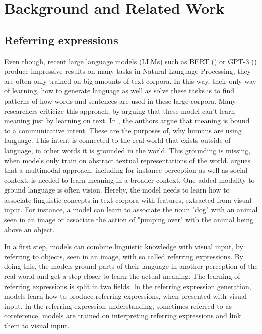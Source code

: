\section{Background and Related Work}
\label{sec:background}

\subsection{Referring expressions}
Even though, recent large language models (LLMs) such as BERT (\citet{Devlin2018}) or GPT-3 (\citet{Brown2020}) produce impressive results on many tasks in Natural Language Processing, they are often only trained on big amounts of text corpora.
In this way, their only way of learning, how to generate language as well as solve these tasks is to find patterns of how words and sentences are used in these large corpora.
Many researchers criticize this approach, by arguing that these model can't learn meaning just by learning on text.
In \citet{Bender2020}, the authors argue that meaning is bound to a communicative intent.
These are the purposes of, why humans are using language.
This intent is connected to the real world that exists outside of language, in other words it is grounded in the world.
This grounding is missing, when models only train on abstract textual representations of the world.
\citet{Bisk2020} argues that a multimodal approach, including for instance perception as well as social context, is needed to learn meaning in a broader context.
One added modality to ground language is often vision. 
Hereby, the model needs to learn how to associate linguistic concepts in text corpora with features, extracted from visual input.
For instance, a model can learn to associate the noun "dog" with an animal seen in an image or associate the action of "jumping over" with the animal being above an object.

In a first step, models can combine linguistic knowledge with visual input, by referring to objects, seen in an image, with so called referring expressions.
By doing this, the models ground parts of their language in another perception of the real world and get a step closer to learn the actual meaning.
The learning of referring expressions is split in two fields.
In the referring expression generation, models learn how to produce referring expressions, when presented with visual input.
In the referring expression understanding, sometimes referred to as coreference, models are trained on interpreting referring expressions and link them to visual input.



